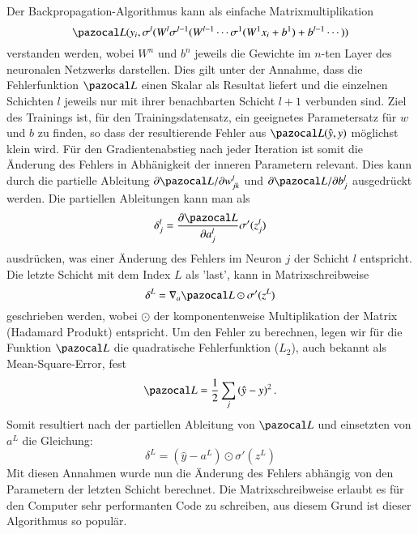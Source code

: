 Der Backpropagation-Algorithmus kann als einfache Matrixmultiplikation
\begin{equation}
\Lb(y_{i}, \sigma^{l}(W^{l}\sigma^{l-1}(W^{l-1}\cdots \sigma^{1}(W^{1}x_i+b^{1}) + b^{l-1} \cdots ) )
\end{equation}
verstanden werden, wobei $W^{n}$ und $b^{n}$ jeweils die Gewichte im $n$-ten Layer des neuronalen Netzwerks darstellen. Dies gilt unter der Annahme, dass die Fehlerfunktion $\Lb$ einen Skalar als Resultat liefert und die einzelnen Schichten $l$ jeweils nur mit ihrer benachbarten Schicht $l+1$ verbunden sind. Ziel des Trainings ist, für den Trainingsdatensatz, ein geeignetes Parametersatz für $w$ und $b$ zu finden, so dass der resultierende Fehler aus $\Lb(\hat{y}, y)$ möglichst klein wird. Für den Gradientenabstieg nach jeder Iteration ist somit die Änderung des Fehlers in Abhänigkeit der inneren Parametern relevant. Dies kann durch die partielle Ableitung $\partial \Lb / \partial w^l_{jk}$ und $\partial \Lb / \partial b^l_j$ ausgedrückt werden. Die partiellen Ableitungen kann man als 
\begin{equation}
\delta^{l}_{j} = \frac{\partial \Lb}{\partial a^{l}_{j}} \sigma'(z^l_j)
\end{equation}
ausdrücken, was einer Änderung des Fehlers im Neuron $j$ der Schicht $l$ entspricht. Die letzte Schicht mit dem Index $L$ als 'last', kann in Matrixschreibweise
\begin{equation}
\delta^{L} = \nabla_a \Lb \odot \sigma'(z^L)
\end{equation}
geschrieben werden, wobei $\odot$ der komponentenweise Multiplikation der Matrix (Hadamard Produkt) entspricht. Um den Fehler zu berechnen, legen wir für die Funktion $\Lb$ die quadratische Fehlerfunktion ($L_2$), auch bekannt als Mean-Square-Error, fest
\begin{equation}
\Lb = \frac{1}{2} \sum_j \left( \hat{y} - y \right)^2 \text{.}
\end{equation}
Somit resultiert nach der partiellen Ableitung von $\Lb$ und einsetzten von $a^L$ die Gleichung:
\begin{equation}
\delta^{L} = (\hat{y} - a^L) \odot \sigma'(z^L)
\end{equation}
Mit diesen Annahmen wurde nun die Änderung des Fehlers abhängig von den Parametern der letzten Schicht berechnet. Die Matrixschreibweise erlaubt es für den Computer sehr performanten Code zu schreiben, aus diesem Grund ist dieser Algorithmus so populär. 

